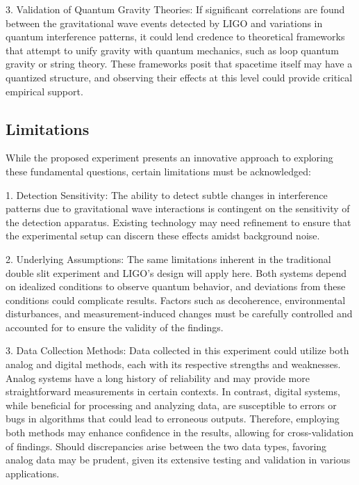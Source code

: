 \documentclass{article}
\begin{document}
3. Validation of Quantum Gravity Theories: If significant correlations are found between the gravitational wave events detected by LIGO and variations in quantum interference patterns, it could lend credence to theoretical frameworks that attempt to unify gravity with quantum mechanics, such as loop quantum gravity or string theory. These frameworks posit that spacetime itself may have a quantized structure, and observing their effects at this level could provide critical empirical support.

\subsection{Limitations}
While the proposed experiment presents an innovative approach to exploring these fundamental questions, certain limitations must be acknowledged:

1. Detection Sensitivity: The ability to detect subtle changes in interference patterns due to gravitational wave interactions is contingent on the sensitivity of the detection apparatus. Existing technology may need refinement to ensure that the experimental setup can discern these effects amidst background noise.

2. Underlying Assumptions: The same limitations inherent in the traditional double slit experiment and LIGO's design will apply here. Both systems depend on idealized conditions to observe quantum behavior, and deviations from these conditions could complicate results. Factors such as decoherence, environmental disturbances, and measurement-induced changes must be carefully controlled and accounted for to ensure the validity of the findings.

3. Data Collection Methods: Data collected in this experiment could utilize both analog and digital methods, each with its respective strengths and weaknesses. Analog systems have a long history of reliability and may provide more straightforward measurements in certain contexts. In contrast, digital systems, while beneficial for processing and analyzing data, are susceptible to errors or bugs in algorithms that could lead to erroneous outputs. Therefore, employing both methods may enhance confidence in the results, allowing for cross-validation of findings. Should discrepancies arise between the two data types, favoring analog data may be prudent, given its extensive testing and validation in various applications.



\end{document}
